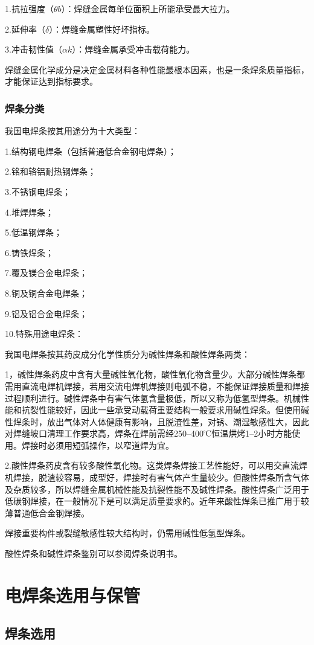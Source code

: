 \documentclass{ctexbook}
\begin{document}
1.抗拉强度（$\theta b$）：焊缝金属每单位面积上所能承受最大拉力。

2.延伸率（$\delta$）：焊缝金属塑性好坏指标。

3.冲击韧性值（$\alpha k$）：焊缝金属承受冲击载荷能力。

焊缝金属化学成分是决定金属材料各种性能最根本因素，也是一条焊条质量指标，才能保证达到指标要求。
\subsubsection{焊条分类}
我国电焊条按其用途分为十大类型：

1.结构钢电焊条（包括普通低合金钢电焊条）；

2.铭和辂铝耐热钢焊条；

3.不锈钢电焊条；

4.堆焊焊条；

5.低温钢焊条；

6.铸铁焊条；

7.覆及镁合金电焊条；

8.铜及铜合金电焊条；

9.铝及铝合金电焊条；

10.特殊用途电焊条：

我国电焊条按其药皮成分化学性质分为碱性焊条和酸性焊条两类：

1，碱性焊条药皮中含有大量碱性氧化物，酸性氧化物含量少。大部分碱性焊条都需用直流电焊机焊接，若用交流电焊机焊接则电弧不稳，不能保证焊接质量和焊接过程顺利进行。碱性焊条中有害气体氢含量极低，所以又称为低氢型焊条。机械性能和抗裂性能较好，因此一些承受动载荷重要结构一般要求用碱性焊条。但使用碱性焊条时，放出气体对人体健康有影响，且脱渣性差，对锈、潮湿敏感性大，因此对焊缝坡口清理工作要求高，焊条在焊前需经250--400℃恒温烘烤1--2小时方能使用。焊接时必须用短弧操作，以窄道焊为宜。

2.酸性焊条药皮含有较多酸性氧化物。这类焊条焊接工艺性能好，可以用交直流焊机焊接，脱渣较容易，成型好，焊接时有害气体产生量较少。但酸性焊条所含气体及杂质较多，所以焊缝金属机械性能及抗裂性能不及碱性焊条。酸性焊条广泛用于低碳钢焊接，在一般情况下是可以满足质量要求的。近年来酸性焊条已推广用于较薄普通低合金钢焊接。

焊接重要构件或裂缝敏感性较大结构时，仍需用碱性低氢型焊条。

酸性焊条和碱性焊条鉴别可以参阅焊条说明书。
\section{电焊条选用与保管}
\subsection{焊条选用}
\end{document}
